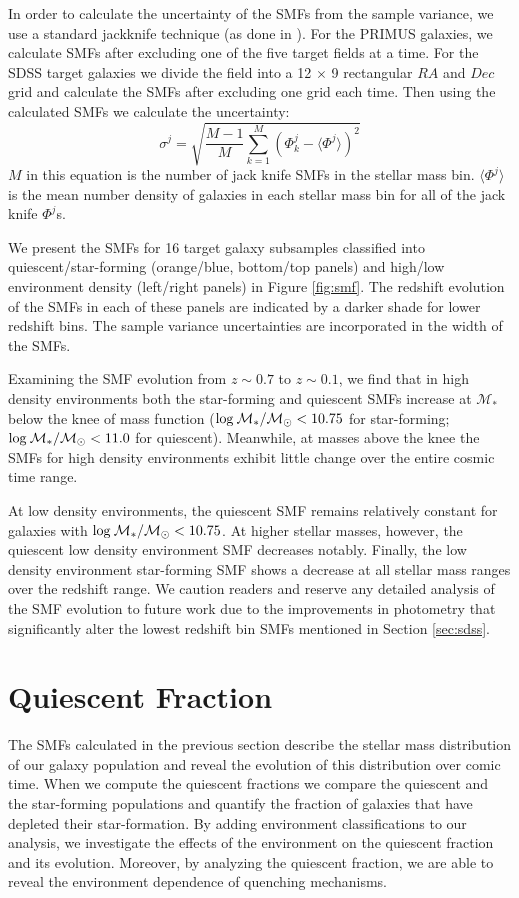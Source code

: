 \documentclass{emulateapj}
\begin{document}
In order to calculate the uncertainty of the SMFs from the sample variance, we use a standard jackknife technique (as done in \cite{Moustakas:2013aa}). For the PRIMUS galaxies, we calculate SMFs after excluding one of the five target fields at a time. For the SDSS target galaxies we divide the field into a 12 $\times$ 9 rectangular $RA$ and $Dec$ grid and calculate the SMFs after excluding one grid each time. Then using the calculated SMFs we calculate the uncertainty: 
\begin{equation}
\sigma^j = \sqrt{\frac{M-1}{M} \sum\limits_{k=1}^{M} (\Phi^j_k - \langle \Phi^j \rangle)^2}
\end{equation} 
$M$ in this equation is the number of jack knife SMFs in the stellar mass bin. $\langle \Phi^j \rangle$ is the mean number density of galaxies 
in each stellar mass bin for all of the jack knife $\Phi^j$s. 

We present the SMFs for 16 target galaxy subsamples classified into quiescent/star-forming (orange/blue, bottom/top panels) and high/low environment density (left/right panels) in Figure \ref{fig:smf}. The redshift evolution of the SMFs in each of these panels are indicated by a darker shade for lower redshift bins. The sample variance uncertainties are incorporated in the width of the SMFs. 

Examining the SMF evolution from $z \sim 0.7$ to $z \sim 0.1$, we find that in high density environments both the star-forming and quiescent SMFs increase at $\mathcal{M}_{*}$ below the knee of mass function ($\rm{log}\: \mathcal{M}_{*}/\mathcal{M}_{\odot} < 10.75$ for star-forming; $\rm{log}\: \mathcal{M}_{*}/\mathcal{M}_{\odot} < 11.0$ for quiescent). Meanwhile, at masses above the knee the SMFs for high density environments exhibit little change over the entire cosmic time range.

At low density environments, the quiescent SMF remains relatively constant for galaxies with $\rm{log}\: \mathcal{M}_{*}/\mathcal{M}_{\odot} < 10.75$. At higher stellar masses, however, the quiescent low density environment SMF decreases notably. Finally, the low density environment star-forming SMF shows a decrease at all stellar mass ranges over the redshift range. We caution readers and reserve any detailed analysis of the SMF evolution to future work due to the improvements in photometry that significantly alter the lowest redshift bin SMFs mentioned in Section \ref{sec:sdss}. 

\section{Quiescent Fraction} \label{sec:qf_const}
The SMFs calculated in the previous section describe the stellar mass distribution of our galaxy population and reveal the evolution of this distribution over comic time. When we compute the quiescent fractions we compare the quiescent and the star-forming populations and quantify the fraction of galaxies that have depleted their star-formation. By adding environment classifications to our analysis, we investigate the effects of the environment on the quiescent fraction and its evolution. Moreover, by analyzing the quiescent fraction, we are able to reveal the environment dependence of quenching mechanisms. 
\end{document}
